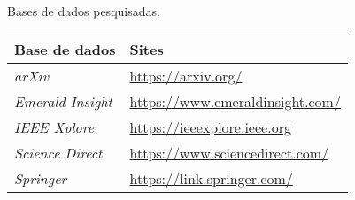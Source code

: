 \begin{quadro}[!htb]
    \centering
    \caption{Bases de dados pesquisadas.\label{qua:basesArtigos}}
    \begin{tabular}{|p{7cm}|p{7cm}|}
		\hline
		\textbf{Base de dados} & \textbf{Sites}                                           \\ \hline
		\textit{arXiv}              & \url{https://arxiv.org/}              \\ \hline
		\textit{Emerald Insight}        & \url{https://www.emeraldinsight.com/} \\ \hline
		\textit{IEEE Xplore}             & \url{https://ieeexplore.ieee.org}     \\ \hline
		\textit{Science Direct}         & \url{https://www.sciencedirect.com/}  \\ \hline
		\textit{Springer}               & \url{https://link.springer.com/}      \\ \hline
    \end{tabular}
\end{quadro}
